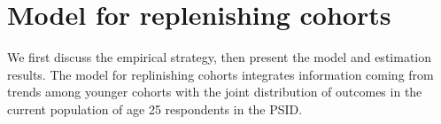 \section{Model for replenishing cohorts}
\label{sec:model_for_new_cohorts}
We first discuss the empirical strategy, then present the model and estimation 
results. The model for replinishing cohorts integrates information coming from trends 
among younger cohorts with the joint distribution of outcomes in the current 
population of age 25 respondents in the PSID.

%

